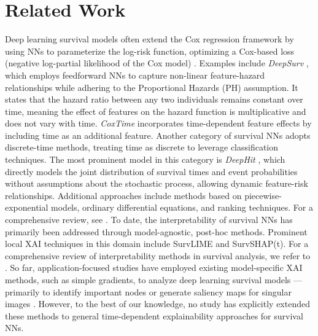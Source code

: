 \section{Related Work}
Deep learning survival models often extend the Cox regression framework by using NNs to parameterize the log-risk function, optimizing a Cox-based loss (negative log-partial likelihood of the Cox model) \cite{cox1972}. Examples include \emph{DeepSurv} \cite{katzman_deepsurv_2018}, which employs feedforward NNs to capture non-linear feature-hazard relationships while adhering to the Proportional Hazards (PH) assumption. It states that the hazard ratio between any two individuals remains constant over time, meaning the effect of features on the hazard function is multiplicative and does not vary with time. \emph{CoxTime} \cite{kvamme_coxtime_2019} incorporates time-dependent feature effects by including time as an additional feature. Another category of survival NNs adopts discrete-time methods, treating time as discrete to leverage classification techniques. The most prominent model in this category is \emph{DeepHit} \cite{lee_deephit_2018}, which directly models the joint distribution of survival times and event probabilities without assumptions about the stochastic process, allowing dynamic feature-risk relationships. Additional approaches include methods based on piecewise-exponential models, ordinary differential equations, and ranking techniques. For a comprehensive review, see \citet{wiegrebe2024deep}. To date, the interpretability of survival NNs has primarily been addressed through model-agnostic, post-hoc methods. Prominent local XAI techniques in this domain include SurvLIME and SurvSHAP(t). For a comprehensive review of interpretability methods in survival analysis, we refer to \citet{langbein2024}. So far, application-focused studies have employed existing model-specific XAI methods, such as simple gradients, to analyze deep learning survival models — primarily to identify important nodes or generate saliency maps for singular images \cite{mobadersany2018predicting,hao2019page,cho2023}. However, to the best of our knowledge, no study has explicitly extended these methods to general time-dependent explainability approaches for survival NNs.